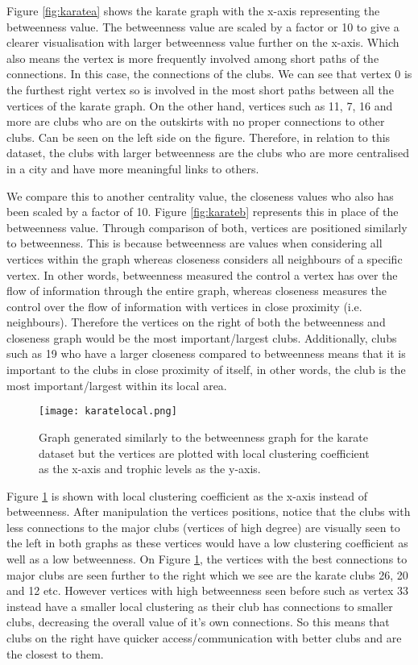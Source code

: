 Figure \ref{fig:karatea} shows the karate graph with the x-axis representing the betweenness value. The betweenness value are scaled by a factor or 10 to give a clearer visualisation with larger betweenness value further on the x-axis. Which also means the vertex is more frequently involved among short paths of the connections. In this case, the connections of the clubs. We can see that vertex 0 is the furthest right vertex so is involved in the most short paths between all the vertices of the karate graph. On the other hand, vertices such as 11, 7, 16 and more are clubs who are on the outskirts with no proper connections to other clubs. Can be seen on the left side on the figure. Therefore, in relation to this dataset, the clubs with larger betweenness are the clubs who are more centralised in a city and have more meaningful links to others.

We compare this to another centrality value, the closeness values who also has been scaled by a factor of 10. Figure \ref{fig:karateb} represents this in place of the betweenness value. Through comparison of both, vertices are positioned similarly to betweenness. This is because betweenness are values when considering all vertices within the graph whereas closeness considers all neighbours of a specific vertex. In other words, betweenness measured the control a vertex has over the flow of information through the entire graph, whereas closeness measures the control over the flow of information with vertices in close proximity (i.e. neighbours). Therefore the vertices on the right of both the betweenness and closeness graph would be the most important/largest clubs. Additionally, clubs such as 19 who have a larger closeness compared to betweenness means that it is important to the clubs in close proximity of itself, in other words, the club is the most important/largest within its local area.

\begin{figure}[H]
	\centering
	\texttt{[image: karatelocal.png]}
	\caption{Graph generated similarly to the betweenness graph for the karate dataset but the vertices are plotted with local clustering coefficient as the x-axis and trophic levels as the y-axis.}
	\label{fig:karatelocal}
\end{figure}


Figure \ref{fig:karatelocal} is shown with local clustering coefficient as the x-axis instead of betweenness. After manipulation the vertices positions, notice that the clubs with less connections to the major clubs (vertices of high degree) are visually seen to the left in both graphs as these vertices would have a low clustering coefficient as well as a low betweenness. On Figure \ref{fig:karatelocal}, the vertices with the best connections to major clubs are seen further to the right which we see are the karate clubs 26, 20 and 12 etc. However vertices with high betweenness seen before such as vertex 33 instead have a smaller local clustering as their club has connections to smaller clubs, decreasing the overall value of it's own connections. So this means that clubs on the right have quicker access/communication with better clubs and are the closest to them.


